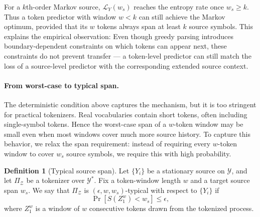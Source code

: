 \documentclass{article}
\theoremstyle{plain}
\theoremstyle{definition}
\newtheorem{definition}{Definition}[section]
\theoremstyle{remark}
\begin{document}
    
    For a $k$th-order Markov source, $\mathcal{L}_Y(w_s)$ reaches the entropy rate once $w_s\ge k$. Thus a token predictor with window $w<k$ can still achieve the Markov optimum, provided that its $w$ tokens always span at least $k$ source symbols. This explains the empirical observation: Even though greedy parsing introduces boundary-dependent constraints on which tokens can appear next, these constraints do not prevent transfer --- a token-level predictor
can still match the loss of a source-level predictor with the corresponding
extended source context.
    
\paragraph{From worst-case to typical span.}
The deterministic condition above captures the mechanism, but it is too
stringent for practical tokenizers.  Real vocabularies contain short tokens,
often including single-symbol tokens.  Hence the worst-case span of a
$w$-token window may be small even when most windows cover much more source
history.  To capture this behavior, we relax the span requirement: instead of
requiring every $w$-token window to cover $w_s$ source symbols, we require this with high probability.

\begin{definitionbox}
\begin{definition}[Typical source span]
\label{def:context_extending}
Let $\{Y_i\}$ be a stationary source on $\mathcal{Y}$, and let
$\Pi_{\mathcal{Z}}$ be a tokenizer over $\mathcal{Y}^*$.  Fix a token-window
length $w$ and a target source span $w_s$.  We say that
$\Pi_{\mathcal{Z}}$ is $(\epsilon,w,w_s)$-typical with respect to $\{Y_i\}$ if
\[
    \Pr\!\left[
        S(Z_1^w) < w_s
    \right]
    \le
    \epsilon,
\]
where $Z_1^w$ is a window of $w$ consecutive tokens drawn from the tokenized
process.
\end{definition}
\end{definitionbox}
    
\end{document}
